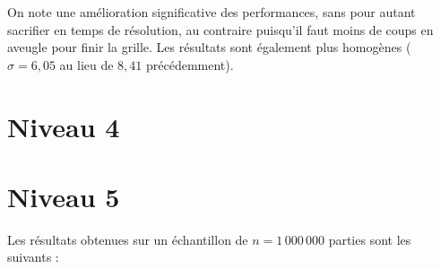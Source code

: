 On note une amélioration significative des performances, sans pour autant sacrifier en temps de résolution, au contraire puisqu'il faut moins de coups en aveugle pour finir la grille. Les résultats sont également plus homogènes ($\sigma=6,05$ au lieu de $8,41$ précédemment).

\newpage
\section{Niveau 4}

\newpage
\section{Niveau 5}
Les résultats obtenues sur un échantillon de $n=1\,000\,000$ parties sont les suivants :

